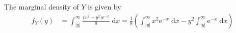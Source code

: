 \documentclass[10pt]{article}
\begin{document}
\begin{itemize}
    The marginal density of \(Y\) is given by 
    \begin{align*}
        f_Y(y) &= \int_{|y|}^{\infty} \frac{\big( x^2 - y^2 \big) \mathrm{e}^{-x}}{8} \;\mathrm{d}x
        = \frac{1}{8} \left( \int_{|y|}^{\infty} x^2 \mathrm{e}^{-x} \;\mathrm{d}x - y^2 \int_{|y|}^{\infty} \mathrm{e}^{-x} \;\mathrm{d}x \right) \\

\end{align*}
\end{itemize}
\end{document}
